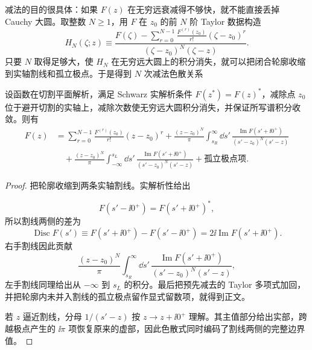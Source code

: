 减法的目的很具体：如果 $F(z)$ 在无穷远衰减得不够快，就不能直接丢掉 Cauchy 大圆。取整数 $N\ge1$，用 $F$ 在 $z_0$ 的前 $N$ 阶 Taylor 数据构造
\begin{equation}
 {
 H_N(\zeta;z)
 \equiv
 \frac{
 F(\zeta)-\displaystyle\sum_{r=0}^{N-1}
 \frac{F^{(r)}(z_0)}{r!}(\zeta-z_0)^r
 }
 {(\zeta-z_0)^N(\zeta-z)}.}
 \label{eq:subtracted-cauchy-kernel-dp68}
\end{equation}
只要 $N$ 取得足够大，使 $H_N$ 在无穷远大圆上的积分消失，就可以把闭合轮廓收缩到实轴割线和孤立极点。于是得到 $N$ 次减法色散关系


\begin{proposition}
设函数在切割平面解析，满足 Schwarz 实解析条件 $F(z^*)=F(z)^*$，减除点 $z_0$ 位于避开切割的实轴上，减除次数使无穷远大圆积分消失，并保证所写谱积分收敛。则有
\begin{equation}
 {
 \begin{aligned}
 F(z)
 &=\sum_{r=0}^{N-1}
 \frac{F^{(r)}(z_0)}{r!}(z-z_0)^r
 +\frac{(z-z_0)^N}{\pi}
 \int_{s_R}^{\infty}\!\dd s'\,
 \frac{\operatorname{Im}F(s'+\ii0^+)}{(s'-z_0)^N(s'-z)}
 \\
 &\quad
 +\frac{(z-z_0)^N}{\pi}
 \int_{-\infty}^{s_L}\!\dd s'\,
 \frac{\operatorname{Im}F(s'+\ii0^+)}{(s'-z_0)^N(s'-z)}
 +\text{孤立极点项}.
 \end{aligned}}
\label{eq:general-subtracted-dispersion-dp9}
\end{equation}
\end{proposition}
\begin{proof}
把轮廓收缩到两条实轴割线。实解析性给出

\begin{equation*}
 F(s'-\ii0^+)=F(s'+\ii0^+)^*,
\end{equation*}
所以割线两侧的差为
\begin{equation*}
 \operatorname{Disc}F(s')
 \equiv F(s'+\ii0^+)-F(s'-\ii0^+)
 =2\ii\operatorname{Im}F(s'+\ii0^+).
\end{equation*}
右手割线因此贡献
\begin{equation*}
 \frac{(z-z_0)^N}{\pi}
 \int_{s_R}^{\infty}\!\dd s'\,
 \frac{\operatorname{Im}F(s'+\ii0^+)}
 {(s'-z_0)^N(s'-z)},
\end{equation*}
左手割线同理给出从 $-\infty$ 到 $s_L$ 的积分。最后把预先减去的 Taylor 多项式加回，并把轮廓内未并入割线的孤立极点留作显式留数项，就得到正文。

若 $z$ 逼近割线，分母 $1/(s'-z)$ 按 $z\to z+\ii0^+$ 理解。其主值部分给出实部，跨越极点产生的 $\ii\pi$ 项恢复原来的虚部，因此色散式同时编码了割线两侧的完整边界值。
\end{proof}

